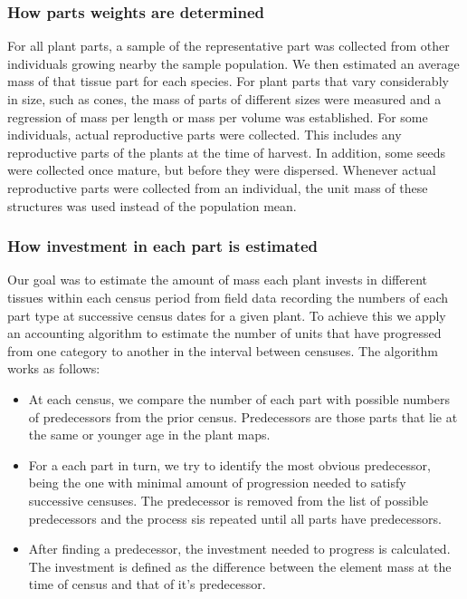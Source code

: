 \documentclass[10pt,twoside]{article}\usepackage[]{graphicx}\usepackage[]{color}
\begin{document}
\subsubsection{How parts weights are determined}

For all plant parts, a sample of the representative part was collected from other individuals growing nearby the sample population. We then estimated an average mass of that tissue part for each species. For plant parts that vary considerably in size, such as cones, the mass of parts of different sizes were measured and a regression of mass per length or mass per volume was established. For some individuals, actual reproductive parts were collected. This includes any reproductive parts of the plants at the time of harvest. In addition, some seeds were collected once mature, but before they were dispersed. Whenever actual reproductive parts were collected from an individual, the unit mass of these structures was used instead of the population mean.

\subsubsection{How investment in each part is estimated}


Our goal was to estimate the amount of mass each plant invests in different tissues within each census period from field data recording the numbers of each part type at successive census dates for a given plant. To achieve this we apply an accounting algorithm to estimate the number of units that have progressed from one category to another in the interval between censuses. The algorithm works as follows:

\begin{itemize}
\item At each census, we compare the number of each part with possible numbers of predecessors from the prior census. Predecessors are those parts that lie at the same or younger age in the plant maps.
\item For a each part in turn, we try to identify the most obvious predecessor, being the one with minimal amount of progression needed to satisfy successive censuses. The predecessor is removed from the list of possible predecessors and the process sis repeated until all parts have predecessors.
\item After finding a predecessor, the investment needed to progress  is calculated. The investment is defined as the difference between the element mass at the time of census and that of it's predecessor.
\end{itemize}
\end{document}

